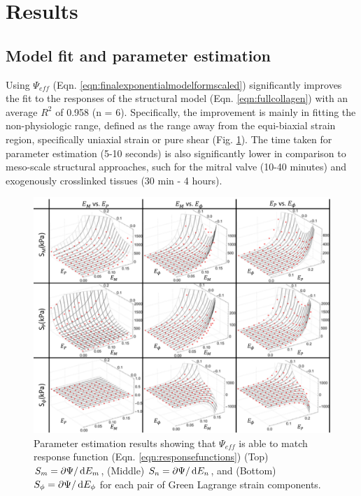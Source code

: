
\section{Results}

\subsection{Model fit and parameter estimation}



	Using $\Psi_{eff}$ (Eqn. \ref{eqn:finalexponentialmodelformscaled}) significantly improves the fit to the responses of the structural model (Eqn. \ref{eqn:fullcollagen}) with an average $R^2$ of 0.958 (n = 6). Specifically, the improvement is mainly in fitting the non-physiologic range, defined as the range away from the equi-biaxial strain region, specifically uniaxial strain or pure shear (Fig. \ref{fig:modelfit}). The time taken for parameter estimation (5-10 seconds) is also significantly lower in comparison to meso-scale structural approaches, such for the mitral valve \cite{zhang_meso_2016} (10-40 minutes) and exogenously crosslinked tissues \cite{zhang_modeling_2017}(30 min - 4 hours).
    
\begin{figure}
\centering
\includegraphics[width=6.5in]{Figures/modelfit}
\caption{Parameter estimation results showing that $\Psi_{eff}$ is able to match response function (Eqn. \ref{eqn:responsefunctions}) (Top) $S_m = \partial\Psi/\dif E_m$, (Middle) $S_n = \partial\Psi/\dif E_n$, and (Bottom) $S_\phi = \partial\Psi/\dif E_\phi$ for each pair of Green Lagrange strain components.}
\label{fig:modelfit}
\end{figure} 
    
